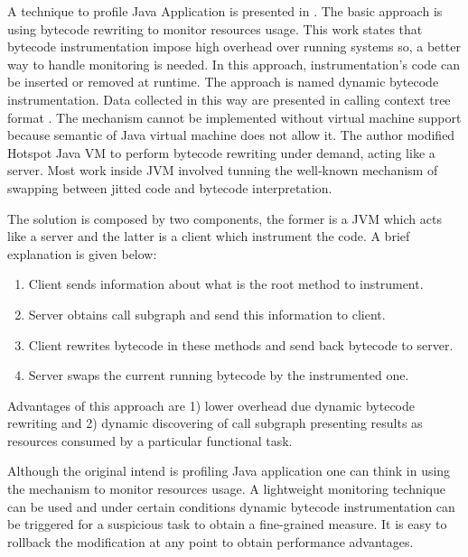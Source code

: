 
A technique to profile Java Application is presented in \cite{Dmitriev:2004:PJA:974043.974067}. The basic approach is using bytecode rewriting to monitor resources usage. This work states that bytecode instrumentation impose high overhead over running systems so, a better way to handle monitoring is needed. In this approach, instrumentation's code can be inserted or removed at runtime. The approach is named dynamic bytecode instrumentation. Data collected in this way are presented in calling context tree format \cite{Ammons:1997:EHP:258916.258924}. The mechanism cannot be implemented without virtual machine support because semantic of Java virtual machine does not allow it. The author modified Hotspot Java VM to perform bytecode rewriting under demand, acting like a server. Most work inside JVM involved tunning the well-known mechanism of swapping between jitted code and bytecode interpretation.

The solution is composed by two components, the former is a JVM which acts like a server and the latter is a client which instrument the code. A brief explanation is given below:
\begin{enumerate}
\item Client sends information about what is the root method to instrument.
\item Server obtains call subgraph and send this information to client.
\item Client rewrites bytecode in these methods and send back bytecode to server.
\item Server swaps the current running bytecode by the instrumented one.
\end{enumerate}
Advantages of this approach are 1) lower overhead due dynamic bytecode rewriting and 2) dynamic discovering of call subgraph presenting results as resources consumed by a particular functional task.

Although the original intend is profiling Java application one can think in using the mechanism to monitor resources usage. A lightweight monitoring technique can be used and under certain conditions dynamic bytecode instrumentation can be triggered for a suspicious task to obtain a fine-grained measure. It is easy to rollback the modification at any point to obtain performance advantages.

